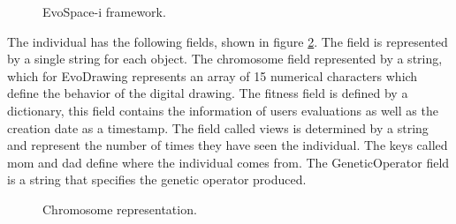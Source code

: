 \begin{figure}
\captionsetup{justification=centering,margin=2cm}
\centering
\setlength\fboxsep{0pt}
\setlength\fboxrule{0.7pt}
\caption{EvoSpace-i framework.}
\label{fig:ESFramework}
\end{figure}


The individual has the following fields, shown in figure \ref{fig:individual_dic}.
The field is represented by a single string for each object. The chromosome
field represented by a string, which for EvoDrawing represents an array of 15
numerical characters which define the behavior of the digital drawing. The
fitness field is defined by a dictionary, this field contains the information of
users evaluations as well as the creation date as a timestamp. The field called
views is determined by a string and represent the number of times they have seen
the individual. The keys called mom and dad define where the individual comes
from. The GeneticOperator field is a string that specifies the genetic operator
produced.

\begin{figure}
\captionsetup{justification=centering,margin=2cm}
\centering
\setlength\fboxsep{0pt}
\setlength\fboxrule{0.7pt}
\caption{Chromosome representation.}
\label{fig:individual_dic}
\end{figure}

